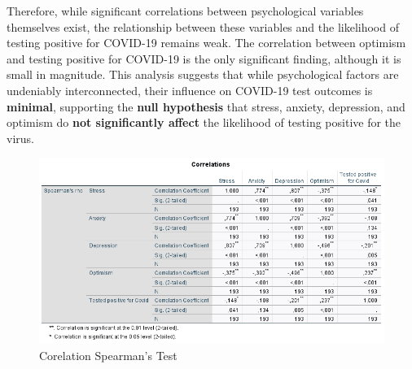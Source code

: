 \documentclass[a4paper]{article}
\begin{document}
\vspace{0.5em}\newline
Therefore, while significant correlations between psychological variables themselves exist, the relationship between these variables and the likelihood of testing positive for COVID-19 remains weak.
The correlation between optimism and testing positive for COVID-19 is the only significant finding, although it is small in magnitude.
\vspace{0.5em}\newline
This analysis suggests that while psychological factors are undeniably interconnected, their influence on COVID-19 test outcomes is \textbf{minimal}, supporting the \textbf{null hypothesis} that stress, anxiety,
depression, and optimism do \textbf{not significantly affect} the likelihood of testing positive for the virus.
\vspace{1.5em}


\begin{figure}[ht]
  \centering
  \caption{Corelation Spearman's Test}
  \label{fig:correlationsTest}
  \includegraphics[width=\textwidth]{img/correlations.png}
\end{figure}
\end{document}
